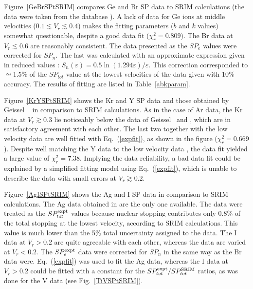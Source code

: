 \documentclass[aps,pra,twocolumn,amsmath,amssymb,floatfix]{revtex4-2}
\begin{document}
Figure~\ref{GeBrSPtSRIM}  compares Ge and Br SP data \cite{Zhang2002,Hvelp68,BrownMoak72,AnthLanf82} to SRIM calculations  (the data \cite{Zhang2002} were taken from the database \cite{IAEASP}). A lack of data for Ge ions at middle velocities ($0.1 \lesssim V_{r} \lesssim 0.4$) makes the fitting parameters ($b$ and $k$ values) somewhat questionable, despite a good data fit ($\chi^{2}_{r} = 0.809$). The Br data at $V_{r} \lesssim 0.6$ \cite{Zhang2002,BrownMoak72,AnthLanf82} are reasonably consistent. The data \cite{BrownMoak72} presented as the $SP_{e}$ values were corrected for $SP_{n}$. The last was calculated with an approximate expression given in reduced values \cite{LNS68}:  $S_{n}(\varepsilon) = 0.5\ln(1.294\varepsilon)/\varepsilon$. This correction corresponded to $\simeq$1.5\% of the $SP_{tot}$ value at the lowest velocities of the data \cite{BrownMoak72} given with 10\% accuracy.  The results of fitting are listed in Table~\ref{abkparam}.

Figure~\ref{KrYSPtSRIM} shows the Kr and Y SP data \cite{Hvelp68,Lennard86,Pape78,Trzaska18,Perkowski09} and those obtained by Geissel \ea\ \cite{IAEASP} in comparison to SRIM calculations. As in the case of Ar data, the Kr data \cite{Pape78} at $V_{r}\gtrsim 0.3$ lie noticeably below the data of Geissel \ea\ and \cite{Trzaska18}, which are in satisfactory agreement with each other. The last two together with the low velocity data \cite{Hvelp68,Lennard86} are well fitted with Eq.~(\ref{expfit}), as shown in the figure ($\chi^{2}_{r} = 0.669$). Despite well matching the Y data \cite{Perkowski09} to the low velocity data \cite{Hvelp68}, the data fit yielded a large value of  $\chi^{2}_{r} = 7.38$. Implying the data \cite{Perkowski09} reliability, a bad data fit could be explained by a simplified fitting model using Eq.~(\ref{expfit}), which is unable to describe the data with small errors at $V_{r} \gtrsim 0.2$.

Figure~\ref{AgISPtSRIM} shows the Ag and I SP data \cite{Lennard86,BrownMoak72,AnthLanf82,Abdess92} in comparison to SRIM calculations. The Ag data obtained in \cite{Lennard86,Abdess92} are the only one available. The data \cite{Abdess92} were treated as the $SP_{tot}^{\rm expt}$ values because nuclear stopping contributes only 0.8\% of the total stopping at the lowest velocity, according to SRIM calculations. This value is much lower than the 5\% total uncertainty assigned to the data. The I data \cite{BrownMoak72,AnthLanf82,Abdess92} at $V_{r} > 0.2$ are quite agreeable with each other, whereas the data \cite{BrownMoak72,AnthLanf82} are varied at $V_{r} < 0.2$. The $SP_{e}^{\rm expt}$ data \cite{BrownMoak72} were corrected for $SP_{n}$ in the same way as the Br data \cite{BrownMoak72} were. Eq.~(\ref{expfit}) was used to fit the Ag data, whereas the I data at $V_{r} > 0.2$ could be fitted with a constant for the $SP_{tot}^{\rm expt}/SP_{tot}^{\rm SRIM}$ ratios, as was done for the V data (see Fig.~\ref{TiVSPtSRIM}).
\end{document}
